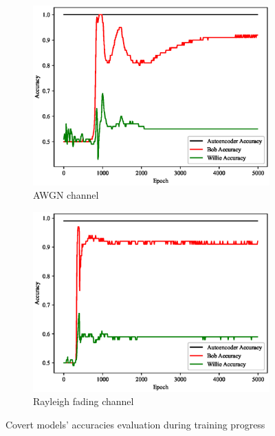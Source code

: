 \begin{figure}[bp!]
	\center
	\begin{subfigure}{0.24\textwidth}
		\includegraphics[width=\linewidth]{figs/training_progress_awgn}
		\caption{AWGN channel}
	\end{subfigure}
	\hfill
	\begin{subfigure}{0.24\textwidth}
		\includegraphics[width=\linewidth]{figs/training_progress_rayleigh}
		\caption{Rayleigh fading channel}	
	\end{subfigure}
	\caption{Covert models' accuracies evaluation during training progress}
	 \label{fig:traning_progress}
\end{figure}
